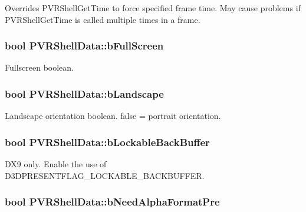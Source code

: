 Overrides P\+V\+R\+Shell\+Get\+Time to force specified frame time. May cause problems if P\+V\+R\+Shell\+Get\+Time is called multiple times in a frame. \hypertarget{struct_p_v_r_shell_data_acaed6a0a872d005e5e9fb057a7fca389}{
\subsubsection[{b\+Full\+Screen}]{\setlength{\rightskip}{0pt plus 5cm}bool P\+V\+R\+Shell\+Data\+::b\+Full\+Screen}}\label{struct_p_v_r_shell_data_acaed6a0a872d005e5e9fb057a7fca389}
Fullscreen boolean. \hypertarget{struct_p_v_r_shell_data_a6bab92dd53e597be3ab6655722823361}{
\subsubsection[{b\+Landscape}]{\setlength{\rightskip}{0pt plus 5cm}bool P\+V\+R\+Shell\+Data\+::b\+Landscape}}\label{struct_p_v_r_shell_data_a6bab92dd53e597be3ab6655722823361}
Landscape orientation boolean. false = portrait orientation. \hypertarget{struct_p_v_r_shell_data_abfcfeee3305dc2b03b754e0d17f7175a}{
\subsubsection[{b\+Lockable\+Back\+Buffer}]{\setlength{\rightskip}{0pt plus 5cm}bool P\+V\+R\+Shell\+Data\+::b\+Lockable\+Back\+Buffer}}\label{struct_p_v_r_shell_data_abfcfeee3305dc2b03b754e0d17f7175a}
D\+X9 only. Enable the use of D3\+D\+P\+R\+E\+S\+E\+N\+T\+F\+L\+A\+G\+\_\+\+L\+O\+C\+K\+A\+B\+L\+E\+\_\+\+B\+A\+C\+K\+B\+U\+F\+F\+E\+R. \hypertarget{struct_p_v_r_shell_data_a91a9c0aa9e8a90aac672cbe6d2bdae1a}{
\subsubsection[{b\+Need\+Alpha\+Format\+Pre}]{\setlength{\rightskip}{0pt plus 5cm}bool P\+V\+R\+Shell\+Data\+::b\+Need\+Alpha\+Format\+Pre}}\label{struct_p_v_r_shell_data_a91a9c0aa9e8a90aac672cbe6d2bdae1a}
